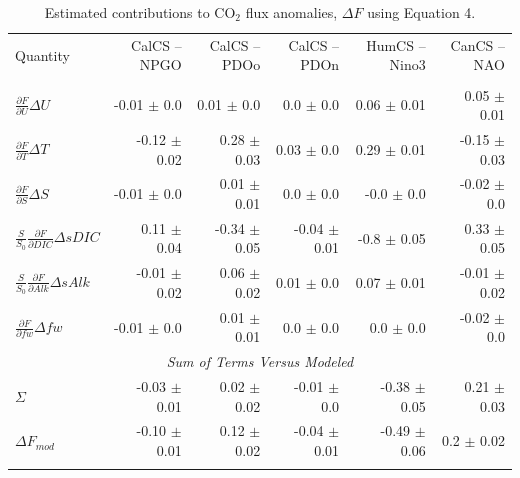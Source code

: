 \documentclass[hvmath, online,bgd]{copernicus_discussions}
\begin{document}
\clearpage
\begin{table}[ht]
	\caption{Estimated contributions to CO$_{2}$ flux anomalies, $\Delta F$ using Equation 4.}
	\begin{adjustbox}{width=1\textwidth}
	\begin{tabular}{l r r r r r}
		\tophline
		Quantity & CalCS -- NPGO  & CalCS -- PDOo & CalCS -- PDOn & HumCS -- Nino3 & CanCS -- NAO \\
		\middlehline
		\multicolumn{6}{c}{{\it Individual Terms}} \\
		$\frac{\partial F}{\partial U}\Delta U$ & -0.01 $\pm$ 0.0  & 0.01 $\pm$ 0.0 & 0.0 $\pm$ 0.0 & 0.06 $\pm$ 0.01  & 0.05 $\pm$ 0.01  \\
		$\frac{\partial F}{\partial T}\Delta T$ & -0.12 $\pm$ 0.02  & 0.28 $\pm$ 0.03 &0.03 $\pm$ 0.0 & 0.29 $\pm$ 0.01  &  -0.15 $\pm$ 0.03 \\
		$\frac{\partial F}{\partial S}\Delta S$ & -0.01 $\pm$ 0.0  & 0.01 $\pm$ 0.01 & 0.0 $\pm$ 0.0 & -0.0 $\pm$ 0.0  &  -0.02 $\pm$ 0.0 \\
		$\frac{S}{S_{0}}\frac{\partial F}{\partial DIC}\Delta sDIC$ & 0.11 $\pm$ 0.04  & -0.34 $\pm$ 0.05 & -0.04 $\pm$ 0.01 & -0.8 $\pm$ 0.05  & 0.33 $\pm$ 0.05  \\
		$\frac{S}{S_{0}}\frac{\partial F}{\partial Alk}\Delta sAlk$ & -0.01 $\pm$ 0.02 & 0.06 $\pm$ 0.02 & 0.01 $\pm$ 0.0 & 0.07 $\pm$ 0.01  &  -0.01 $\pm$ 0.02 \\
		$\frac{\partial F}{\partial fw}\Delta fw$ & -0.01 $\pm$ 0.0 & 0.01 $\pm$ 0.01 & 0.0 $\pm$ 0.0 & 0.0 $\pm$ 0.0  &  -0.02 $\pm$ 0.0 \\
		\multicolumn{6}{c}{{\it Sum of Terms Versus Modeled}} \\
		$\Sigma$ & -0.03 $\pm$ 0.01 & 0.02 $\pm$ 0.02 & -0.01 $\pm$ 0.0 & -0.38 $\pm$ 0.05 & 0.21 $\pm$ 0.03 \\
		$\Delta F_{mod}$ & -0.10 $\pm$ 0.01 & 0.12 $\pm$ 0.02 & -0.04 $\pm$ 0.01 & -0.49 $\pm$ 0.06 & 0.2 $\pm$ 0.02 \\
		\bottomhline
	\end{tabular}
	\end{adjustbox}
\label{Table:2}
\end{table}
\end{document}
